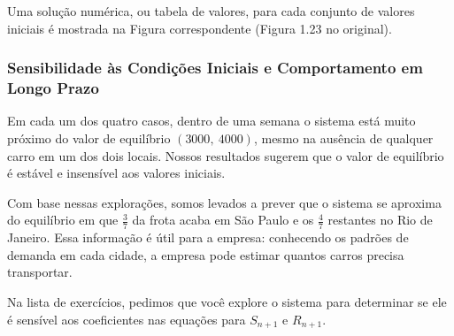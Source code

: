 \documentclass{article}
\begin{document}
Uma solução numérica, ou tabela de valores, para cada conjunto de
valores iniciais é mostrada na Figura correspondente (Figura 1.23 no
original).

\subsubsection{Sensibilidade às Condições Iniciais e Comportamento em Longo Prazo}

Em cada um dos quatro casos, dentro de uma semana o sistema está muito
próximo do valor de equilíbrio \( (3000,\ 4000) \), mesmo na ausência
de qualquer carro em um dos dois locais. Nossos resultados sugerem que
o valor de equilíbrio é estável e insensível aos valores iniciais.

Com base nessas explorações, somos levados a prever que o sistema se
aproxima do equilíbrio em que \( \frac{3}{7} \) da frota acaba em São
Paulo e os \( \frac{4}{7} \) restantes no Rio de Janeiro. Essa
informação é útil para a empresa: conhecendo os padrões de demanda em
cada cidade, a empresa pode estimar quantos carros precisa transportar.

Na lista de exercícios, pedimos que você explore o sistema para
determinar se ele é sensível aos coeficientes nas equações para
\( S_{n+1} \) e \( R_{n+1} \).


\end{document}
